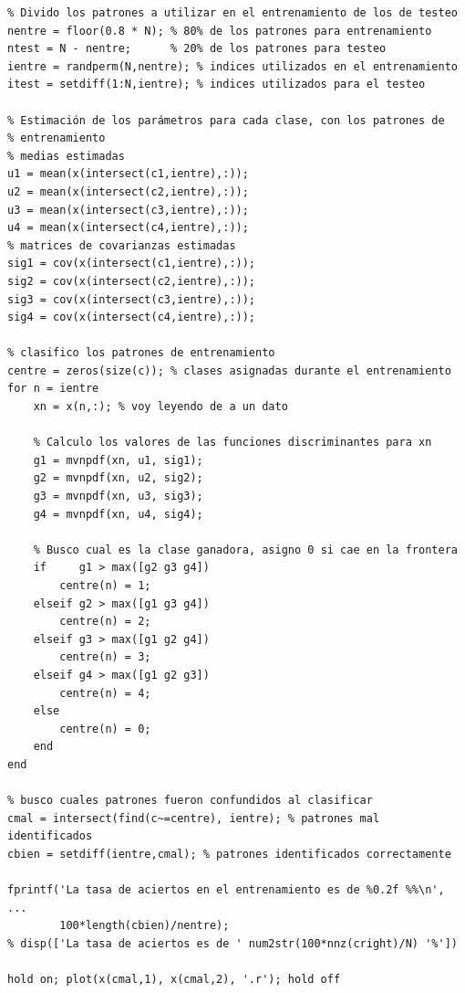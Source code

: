 \documentclass[11pt,a4paper,final]{article}
\begin{document}
\begin{verbatim}
% Divido los patrones a utilizar en el entrenamiento de los de testeo
nentre = floor(0.8 * N); % 80% de los patrones para entrenamiento
ntest = N - nentre;      % 20% de los patrones para testeo
ientre = randperm(N,nentre); % indices utilizados en el entrenamiento
itest = setdiff(1:N,ientre); % indices utilizados para el testeo

% Estimación de los parámetros para cada clase, con los patrones de
% entrenamiento
% medias estimadas
u1 = mean(x(intersect(c1,ientre),:));
u2 = mean(x(intersect(c2,ientre),:));
u3 = mean(x(intersect(c3,ientre),:));
u4 = mean(x(intersect(c4,ientre),:));
% matrices de covarianzas estimadas
sig1 = cov(x(intersect(c1,ientre),:));
sig2 = cov(x(intersect(c2,ientre),:));
sig3 = cov(x(intersect(c3,ientre),:));
sig4 = cov(x(intersect(c4,ientre),:));

% clasifico los patrones de entrenamiento
centre = zeros(size(c)); % clases asignadas durante el entrenamiento
for n = ientre
    xn = x(n,:); % voy leyendo de a un dato

    % Calculo los valores de las funciones discriminantes para xn
    g1 = mvnpdf(xn, u1, sig1);
    g2 = mvnpdf(xn, u2, sig2);
    g3 = mvnpdf(xn, u3, sig3);
    g4 = mvnpdf(xn, u4, sig4);

    % Busco cual es la clase ganadora, asigno 0 si cae en la frontera
    if     g1 > max([g2 g3 g4])
        centre(n) = 1;
    elseif g2 > max([g1 g3 g4])
        centre(n) = 2;
    elseif g3 > max([g1 g2 g4])
        centre(n) = 3;
    elseif g4 > max([g1 g2 g3])
        centre(n) = 4;
    else
        centre(n) = 0;
    end
end

% busco cuales patrones fueron confundidos al clasificar
cmal = intersect(find(c~=centre), ientre); % patrones mal identificados
cbien = setdiff(ientre,cmal); % patrones identificados correctamente

fprintf('La tasa de aciertos en el entrenamiento es de %0.2f %%\n', ...
        100*length(cbien)/nentre);
% disp(['La tasa de aciertos es de ' num2str(100*nnz(cright)/N) '%'])

hold on; plot(x(cmal,1), x(cmal,2), '.r'); hold off
\end{verbatim}

\end{document}
